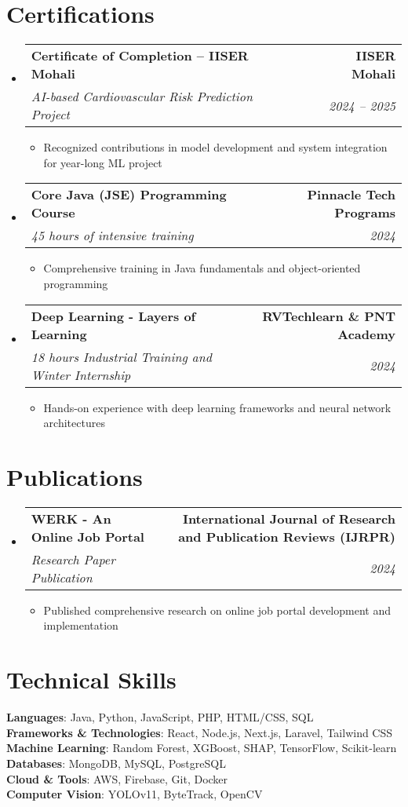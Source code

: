 \documentclass[letterpaper,11pt]{article}
\makeatletter
\newcommand{\resumeItem}[1]{
  \item\small{
    {#1 \vspace{-2pt}}
  }
}
\newcommand{\resumeSubheading}[4]{
  \vspace{-2pt}\item
    \begin{tabular*}{1.0\textwidth}[t]{l@{\extracolsep{\fill}}r}
      \textbf{#1} & \textbf{\small #2} \\
      \textit{\small#3} & \textit{\small #4} \\
    \end{tabular*}\vspace{-7pt}
}
\newcommand{\resumeSubHeadingListStart}{\begin{itemize}[leftmargin=0.0in, label={}]}
\newcommand{\resumeSubHeadingListEnd}{\end{itemize}}
\newcommand{\resumeItemListStart}{\begin{itemize}}
\newcommand{\resumeItemListEnd}{\end{itemize}\vspace{-5pt}}
\makeatother
\begin{document}
\section{Certifications}
    \resumeSubHeadingListStart
      \resumeSubheading
        {Certificate of Completion -- IISER Mohali}{IISER Mohali}
        {AI-based Cardiovascular Risk Prediction Project}{2024 -- 2025}
        \resumeItemListStart
          \resumeItem{Recognized contributions in model development and system integration for year-long ML project}
        \resumeItemListEnd
      \resumeSubheading
        {Core Java (JSE) Programming Course}{Pinnacle Tech Programs}
        {45 hours of intensive training}{2024}
        \resumeItemListStart
          \resumeItem{Comprehensive training in Java fundamentals and object-oriented programming}
        \resumeItemListEnd
      \resumeSubheading
        {Deep Learning - Layers of Learning}{RVTechlearn \& PNT Academy}
        {18 hours Industrial Training and Winter Internship}{2024}
        \resumeItemListStart
          \resumeItem{Hands-on experience with deep learning frameworks and neural network architectures}
        \resumeItemListEnd
    \resumeSubHeadingListEnd

\section{Publications}
    \resumeSubHeadingListStart
      \resumeSubheading
        {WERK - An Online Job Portal}{International Journal of Research and Publication Reviews (IJRPR)}
        {Research Paper Publication}{2024}
        \resumeItemListStart
          \resumeItem{Published comprehensive research on online job portal development and implementation}
        \resumeItemListEnd
    \resumeSubHeadingListEnd

\section{Technical Skills}
 \begin{itemize}[leftmargin=0.15in, label={}]
    \small{\item{
     \textbf{Languages}{: Java, Python, JavaScript, PHP, HTML/CSS, SQL} \\
     \textbf{Frameworks \& Technologies}{: React, Node.js, Next.js, Laravel, Tailwind CSS} \\
     \textbf{Machine Learning}{: Random Forest, XGBoost, SHAP, TensorFlow, Scikit-learn} \\
     \textbf{Databases}{: MongoDB, MySQL, PostgreSQL} \\
     \textbf{Cloud \& Tools}{: AWS, Firebase, Git, Docker} \\
     \textbf{Computer Vision}{: YOLOv11, ByteTrack, OpenCV}
    }}
 \end{itemize}
 \vspace{-16pt}
\end{document}
